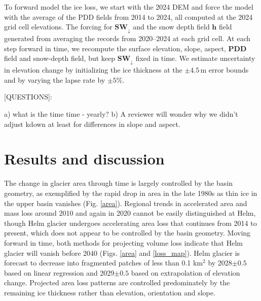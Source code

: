 \documentclass[annals,twocolumn,letterpaper]{igs.cls}
\begin{document}
To forward model the ice loss, we start with the 2024 DEM and force the model with the average of the PDD fields from 2014 to 2024, all computed at the 2024 grid cell elevations. The forcing for $\mathbf{SW_{\downarrow}}$ and the snow depth field $\mathbf{h}$ field  generated from averaging the records from 2020--2024 at each grid cell. At each step forward in time, we recompute the surface elevation, slope, aspect, $\mathbf{PDD}$ field and snow-depth field, but keep $\mathbf{SW_{\downarrow}}$ fixed in time. We estimate uncertainty in elevation change by initializing the ice thickness at the $\pm 4.5$\,m error bounds and by varying the lapse rate by $\pm 5\%$. 

[QUESTIONS]: 

a) what is the time time - yearly?
b) A reviewer will wonder why we didn't adjust kdown at least for differences in slope and aspect.


\section{Results and discussion}

The change in glacier area through time is largely controlled by the basin geometry, as exemplified by the rapid drop in area in the late 1980s as thin ice in the upper basin vanishes (Fig. \ref{area}). Regional trends in accelerated area and mass loss around 2010 \citep{Bevington2022,Menounos2019} and again in 2020 \citep{Menounos2025} cannot be easily distinguished at Helm, though Helm glacier undergoes accelerating area loss that continues from 2014 to present, which does not appear to be controlled by the basin geometry. Moving forward in time, both methods for projecting volume loss indicate that Helm glacier will vanish before 2040 (Figs. \ref{area} and \ref{loss_map}). Helm glacier is forecast to decrease into fragmented patches of less than 0.1 km$^2$ by 2028$\pm0.5$ based on linear regression and 2029$\pm0.5$ based on extrapolation of elevation change. Projected area loss patterns are controlled predominately by the remaining ice thickness rather than elevation, orientation and slope. 
\end{document}
